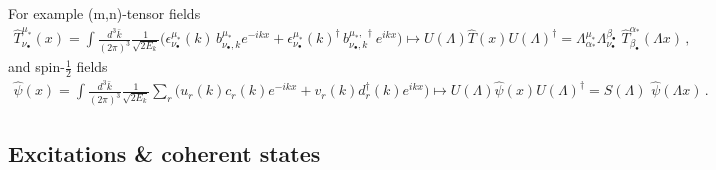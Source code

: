 \documentclass[../QFT_main.tex]{subfiles}
\begin{document}
\begin{mytheorem}
For example (m,n)-tensor fields
{\small\begin{align}
    \hat{T}^{\mu_*}_{\nu_\bullet}(x) = \int \frac{d^3\bar{k}}{(2\pi)^3} \frac{1}{\sqrt{2E_k}} \Big( \epsilon^{\mu_*}_{\nu_\bullet}(k)\,b^{\mu_*}_{\nu_\bullet,k} e^{-ikx} + \epsilon^{\mu_*}_{\nu_\bullet}(k)^\dagger\,b^{\mu_*, \, \dagger}_{\nu_\bullet,k} e^{ikx} \Big)
    \mapsto U(\Lambda)\hat{T}(x)U(\Lambda)^\dagger = \Lambda^{\mu_*}_{\alpha_*} \Lambda_{\nu_\bullet}^{\beta_\bullet} \,\,\hat{T}^{\alpha_*}_{\beta_\bullet}(\Lambda x)\,,
\end{align}}
and spin-$\tfrac12$ fields
{\small\begin{align}
    \hat{\psi}(x) = \int \frac{d^3\bar{k}}{(2\pi)^3} \frac{1}{\sqrt{2E_k}}\sum_r \Big( u_r(k)c_r(k) e^{-ikx} + v_r(k)d_r^{\dagger}(k) e^{ikx} \Big)
    \mapsto U(\Lambda)\hat{\psi}(x)U(\Lambda)^\dagger = S(\Lambda)\,\,\hat{\psi}(\Lambda x)\,.
\end{align}}
%
\end{mytheorem}




\subsection{Excitations \& coherent states}
\end{document}
